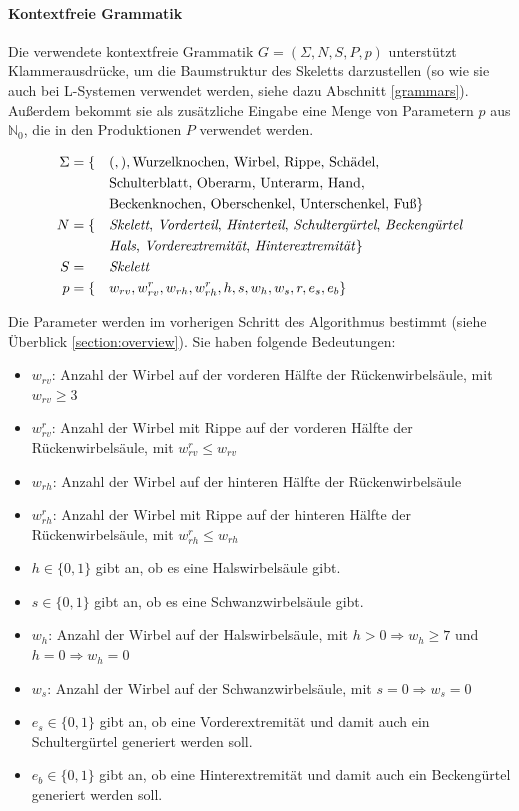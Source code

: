 \paragraph{Kontextfreie Grammatik}
Die verwendete kontextfreie Grammatik $G = (\Sigma, N, S, P, p)$ unterstützt Klammerausdrücke, um die Baumstruktur des Skeletts darzustellen (so wie sie auch bei L-Systemen verwendet werden, siehe dazu Abschnitt \ref{grammars}). Außerdem bekommt sie als zusätzliche Eingabe eine Menge von Parametern $p$ aus $\mathbb{N}_0$, die in den Produktionen $P$ verwendet werden.

\begin{alignat*}{2}
 \Sigma & = \{&&(, ), \text{Wurzelknochen, Wirbel, Rippe, Schädel,}\\  
        & &&\text{Schulterblatt, Oberarm, Unterarm, Hand,}\\ 
        & &&\text{Beckenknochen, Oberschenkel, Unterschenkel, Fuß}\}\\
 N &= \{&&\text{\emph{Skelett}, \emph{Vorderteil}, \emph{Hinterteil}, \emph{Schultergürtel}, \emph{Beckengürtel}}\\
        & &&\text{\emph{Hals}, \emph{Vorderextremität}, \emph{Hinterextremität}}\}\\
 S &= &&\text{\emph{Skelett}}\\
 p &= \{&&w_{rv}, w_{rv}^r, w_{rh}, w_{rh}^r, h, s, w_h, w_s, r, e_s, e_b \}
\end{alignat*}

\newpage
Die Parameter werden im vorherigen Schritt des Algorithmus bestimmt (siehe Überblick \ref{section:overview}). Sie haben folgende Bedeutungen:
\begin{itemize}
 \item $w_{rv}$: Anzahl der Wirbel auf der vorderen Hälfte der Rückenwirbelsäule, mit $w_{rv} \geq 3$
 \item $w_{rv}^r$: Anzahl der Wirbel mit Rippe auf der vorderen Hälfte der Rückenwirbelsäule, mit $w_{rv}^r \leq w_{rv}$
 \item $w_{rh}$: Anzahl der Wirbel auf der hinteren Hälfte der Rückenwirbelsäule
 \item $w_{rh}^r$: Anzahl der Wirbel mit Rippe auf der hinteren Hälfte der Rückenwirbelsäule, mit $w_{rh}^r \leq w_{rh}$
 \item $h \in \{0,1\}$ gibt an, ob es eine Halswirbelsäule gibt.
 \item $s \in \{0,1\}$ gibt an, ob es eine Schwanzwirbelsäule gibt.
 \item $w_h$: Anzahl der Wirbel auf der Halswirbelsäule, mit $h > 0 \Rightarrow w_h \geq 7$ und \mbox{$h = 0 \Rightarrow w_h = 0$}
 \item $w_s$: Anzahl der Wirbel auf der Schwanzwirbelsäule, mit $s = 0 \Rightarrow w_s = 0$
 \item $e_s \in \{0, 1\}$ gibt an, ob eine Vorderextremität und damit auch ein Schultergürtel generiert werden soll.
 \item $e_b \in \{0, 1\}$ gibt an, ob eine Hinterextremität und damit auch ein Beckengürtel generiert werden soll.
\end{itemize}


